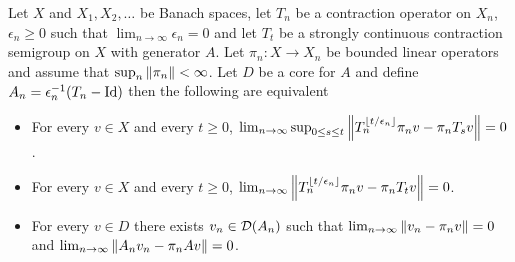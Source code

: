 \begin{thm}\label{KurtzDiscreteTimeSemigroupConvergence}Let $X$ and $X_1, X_2, \dotsc$ be Banach spaces, let $T_{n}$ be a contraction operator on $X_n$, $\epsilon_n \geq 0 $ such that $\lim_{n\to \infty} \epsilon_n = 0$ and let $T_t$ be a strongly continuous contraction semigroup on $X$ with generator $A$.  Let $\pi_n : X \to X_n$ be bounded linear operators and assume that $\sup_{n} \left \lVert \pi_n \right \rVert < \infty$.  Let $D$ be a
core for $A$ and define $A_n = \epsilon_n^{-1}(T_n-\operatorname*{Id})$ then the following are equivalent
\begin{itemize}
\item[(i)]For every $v \in X$ and every $t \geq 0$,  $\lim_{n \to \infty} \sup_{0 \leq s \leq t} \left \lVert T^{\left \lfloor t/\epsilon_n \right \rfloor}_{n} \pi_n v - \pi_n T_s v \right \rVert = 0$.
\item[(ii)]For every $v \in X$ and every $t \geq 0$,  $\lim_{n \to \infty} \left \lVert T^{\left \lfloor t/\epsilon_n \right \rfloor}_{n} \pi_n v - \pi_n T_t v \right \rVert = 0$.
\item[(iii)] For every $v \in D$ there exists $v_n \in \mathcal{D}(A_n)$ such that $\lim_{n \to \infty} \left \lVert v_n - \pi_n v \right \rVert = 0$ and $\lim_{n \to \infty} \left \lVert A_n v_n - \pi_n A v \right \rVert = 0$.
\end{itemize}
\end{thm}
